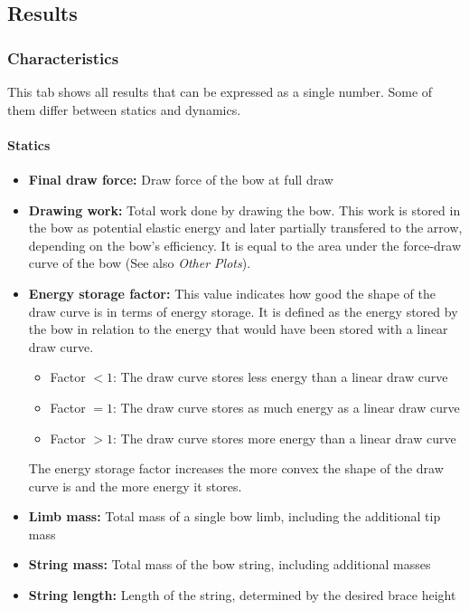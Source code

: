 \documentclass[12pt]{article}
\begin{document}
\newpage
\subsection{Results}

\subsubsection{Characteristics}

This tab shows all results that can be expressed as a single number.
Some of them differ between statics and dynamics.

\paragraph*{Statics}

\begin{itemize}
\item \textbf{Final draw force:} Draw force of the bow at full draw
\item \textbf{Drawing work:} Total work done by drawing the bow. This work is stored in the bow as potential elastic energy and later partially transfered to the arrow, depending on the bow's efficiency. It is equal to the area under the force-draw curve of the bow (See also \textit{Other Plots}).
\item \textbf{Energy storage factor:} This value indicates how good the shape of the draw curve is in terms of energy storage.
It is defined as the energy stored by the bow in relation to the energy that would have been stored with a linear draw curve.

\begin{itemize}
\item Factor $< 1$: The draw curve stores less energy than a linear draw curve
\item Factor $= 1$: The draw curve stores as much energy as a linear draw curve
\item Factor $> 1$: The draw curve stores more energy than a linear draw curve
\end{itemize}

The energy storage factor increases the more convex the shape of the draw curve is and the more energy it stores.

\item \textbf{Limb mass:} Total mass of a single bow limb, including the additional tip mass
\item \textbf{String mass:}  Total mass of the bow string, including additional masses
\item \textbf{String length:} Length of the string, determined by the desired brace height
\end{itemize}
\end{document}
